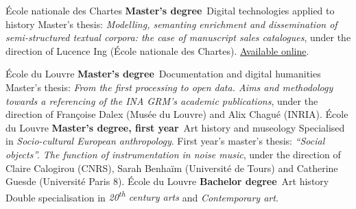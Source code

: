 	{%
		École nationale des Chartes}
	{%
		\textbf{Master's degree}~Digital technologies applied to history}
	{%
		Master's thesis: \textit{Modelling, semanting enrichment and dissemination of semi-structured textual corpora: the case of manuscript sales catalogues}, under the direction of Lucence Ing (École nationale des Chartes). \href{https://dumas.ccsd.cnrs.fr/dumas-04541009v1}{Available online}.}

	{%
		École du Louvre}
	{%
		\textbf{Master's degree}~Documentation and digital humanities}
	{%
		Master's thesis: \textit{From the first processing to open data. Aims and methodology towards a referencing of the INA GRM's academic publications}, under the direction of Françoise Dalex (Musée du Louvre) and Alix Chagué (INRIA).}
	{%
		École du Louvre}
	{%
		\textbf{Master's degree, first year}~Art history and museology}
	{%
		Specialised in \textit{Socio-cultural European anthropology}. First year's master's thesis: \textit{\enquote{Social objects}. The function of instrumentation in noise music}, under the direction of Claire Calogirou (CNRS), Sarah Benhaïm (Université de Tours) and Catherine Guesde (Université Paris 8).}
	{%
		École du Louvre}
	{%
		\textbf{Bachelor degree}~Art history}
	{%
		Double specialisation in \textit{20\textsuperscript{th} century arts} and \textit{Contemporary art}.}
	